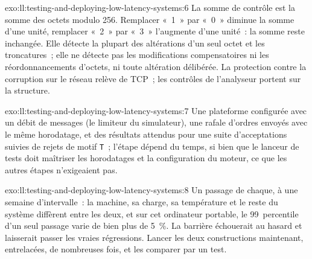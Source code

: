 \begin{solution}{exo:ll:testing-and-deploying-low-latency-systems:6}
La somme de contrôle est la somme des octets modulo 256. Remplacer «~1~» par «~0~» diminue la somme d'une unité, remplacer «~2~» par «~3~» l'augmente
d'une unité~: la somme reste inchangée. Elle détecte la plupart des altérations d'un seul octet et les troncatures~; elle ne détecte pas les modifications compensatoires
ni les réordonnancements d'octets, ni toute altération délibérée. La protection contre la corruption sur le réseau relève de TCP~; les contrôles de l'analyseur
portent sur la structure.
\end{solution}

\begin{solution}{exo:ll:testing-and-deploying-low-latency-systems:7}
Une plateforme configurée avec un débit de messages (le limiteur du simulateur), une rafale d'ordres envoyés avec le même horodatage, et
des résultats attendus pour une suite d'acceptations suivies de rejets de motif \texttt{T}~; l'étape dépend du temps, si bien que le
lanceur de tests doit maîtriser les horodatages et la configuration du moteur, ce que les autres étapes n'exigeaient pas.
\end{solution}

\begin{solution}{exo:ll:testing-and-deploying-low-latency-systems:8}
Un passage de chaque, à une semaine d'intervalle~: la machine, sa charge, sa température et le reste du système diffèrent entre les deux, et
sur cet ordinateur portable, le 99~percentile d'un seul passage varie de bien plus de 5~\%. La barrière échouerait au hasard et laisserait passer les vraies
régressions. Lancer les deux constructions maintenant, entrelacées, de nombreuses fois, et les comparer par un test.
\end{solution}

